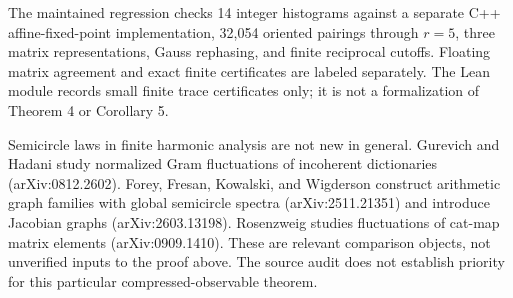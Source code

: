 \documentclass[
  11pt,
]{article}
\begin{document}
The maintained regression checks 14 integer histograms against a
separate C++ affine-fixed-point implementation, 32,054 oriented pairings
through \(r=5\), three matrix representations, Gauss rephasing, and
finite reciprocal cutoffs. Floating matrix agreement and exact finite
certificates are labeled separately. The Lean module records small
finite trace certificates only; it is not a formalization of Theorem 4
or Corollary 5.

Semicircle laws in finite harmonic analysis are not new in general.
Gurevich and Hadani study normalized Gram fluctuations of incoherent
dictionaries (arXiv:0812.2602). Forey, Fresan, Kowalski, and Wigderson
construct arithmetic graph families with global semicircle spectra
(arXiv:2511.21351) and introduce Jacobian graphs (arXiv:2603.13198).
Rosenzweig studies fluctuations of cat-map matrix elements
(arXiv:0909.1410). These are relevant comparison objects, not unverified
inputs to the proof above. The source audit does not establish priority
for this particular compressed-observable theorem.
\end{document}
